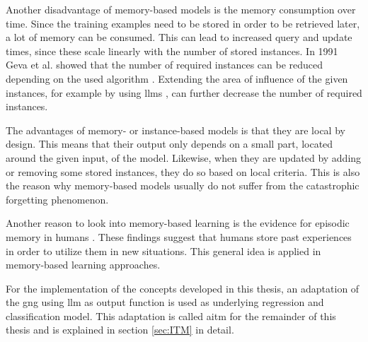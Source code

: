 Another disadvantage of memory-based models is the memory consumption over time. Since the training examples need to be stored in order to be retrieved later, a lot of memory can be consumed. This can lead to increased query and update times, since these scale linearly with the number of stored instances. In 1991 Geva et al. showed that the number of required instances can be reduced depending on the used algorithm \cite{protReduction}. Extending the area of influence of the given instances, for example by using \glspl{llm} \cite{LLM}, can further decrease the number of required instances.

The advantages of memory- or instance-based models is that they are local by design. This means that their output only depends on a small part, located around the given input, of the model. Likewise, when they are updated by adding or removing some stored instances, they do so based on local criteria. This is also the reason why memory-based models usually do not suffer from the catastrophic forgetting phenomenon.

Another reason to look into memory-based learning is the evidence for episodic memory in humans \cite{tulving2002episodic}. These findings suggest that humans store past experiences in order to utilize them in new situations. This general idea is applied in memory-based learning approaches.

For the implementation of the concepts developed in this thesis, an adaptation of the \gls{gng} using \gls{llm} as output function is used as underlying regression and classification model. This adaptation is called \gls{aitm} for the remainder of this thesis and is explained in section \ref{sec:ITM} in detail.

%
%
%

